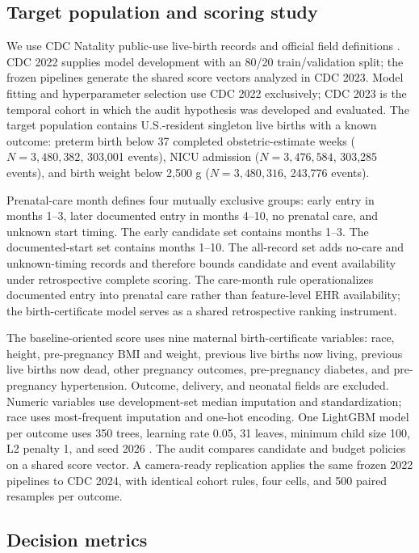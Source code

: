 \documentclass{article}
\begin{document}
\subsection{Target population and scoring study}

We use CDC Natality public-use live-birth records and official field
definitions \citep{cdcNatality,cdcWorksheet}. CDC 2022 supplies model
development with an 80/20 train/validation split; the frozen pipelines generate
the shared score vectors analyzed in CDC 2023. Model fitting and hyperparameter
selection use CDC 2022 exclusively; CDC 2023 is the temporal cohort in which
the audit hypothesis was developed and evaluated. The target population contains
U.S.-resident singleton live births with a known outcome: preterm birth below
37 completed obstetric-estimate weeks ($N=3{,}480{,}382$, 303,001 events), NICU
admission ($N=3{,}476{,}584$, 303,285 events), and birth weight below 2,500 g
($N=3{,}480{,}316$, 243,776 events).

Prenatal-care month defines four mutually exclusive groups: early entry in
months 1--3, later documented entry in months 4--10, no prenatal care, and
unknown start timing. The early candidate set contains months 1--3. The
documented-start set contains months 1--10. The all-record set adds no-care and
unknown-timing records and therefore bounds candidate and event availability
under retrospective complete scoring. The care-month rule operationalizes
documented entry into prenatal care rather than feature-level EHR availability;
the birth-certificate model serves as a shared retrospective ranking instrument.

The baseline-oriented score uses nine maternal birth-certificate variables:
race, height, pre-pregnancy BMI and weight, previous live births now living,
previous live births now dead, other pregnancy outcomes, pre-pregnancy
diabetes, and pre-pregnancy hypertension. Outcome, delivery, and neonatal
fields are excluded. Numeric variables use development-set median imputation
and standardization; race uses most-frequent imputation and one-hot encoding.
One LightGBM model per outcome uses 350 trees, learning rate 0.05, 31 leaves,
minimum child size 100, L2 penalty 1, and seed 2026 \citep{ke2017lightgbm}. The audit compares
candidate and budget policies on a shared score vector. A camera-ready
replication applies the same frozen 2022 pipelines to CDC 2024, with identical
cohort rules, four cells, and 500 paired resamples per outcome.

\subsection{Decision metrics}
\end{document}
